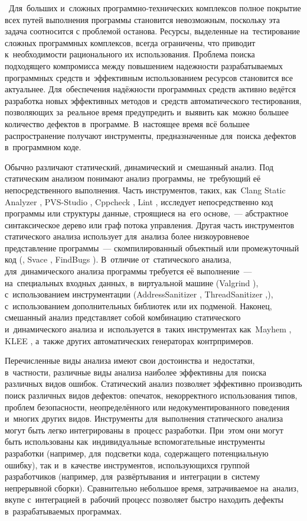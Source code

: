 \actuality\
Для~больших и~сложных программно-технических комплексов полное покрытие всех путей выполнения программы становится невозможным, поскольку эта задача соотносится с проблемой останова. Ресурсы, выделенные на~тестирование сложных программных комплексов, всегда ограничены, что приводит к~необходимости рационального  их использования. Проблема поиска подходящего компромисса  между повышением надежности разрабатываемых программных средств и~эффективным использованием ресурсов становится все актуальнее. Для~обеспечения надёжности программных средств  активно ведётся разработка новых эффективных методов и~средств автоматического тестирования, позволяющих за~реальное время предупредить и~выявить как~можно большее количество дефектов в~программе. В~настоящее время всё большее распространение получают инструменты, предназначенные для~поиска дефектов в~программном коде.

Обычно различают статический, динамический и~смешанный анализ. Под статическим анализом понимают анализ программы, не~требующий её непосредственного выполнения. Часть инструментов, таких, как~Clang Static Analyzer \cite{csa}, PVS-Studio \cite{pvs}, Cppcheck \cite{cppcheck}, Lint \cite{lint}, исследует непосредственно код программы или структуры данные, строящиеся на~его основе,~--- абстрактное синтаксическое дерево или граф потока управления. Другая часть инструментов статического анализа использует для~анализа более низкоуровневое представление программы~--- скомпилированный объектный или промежуточный код (, Svace \cite{svace}, FindBugs \cite{findbugs}). В~отличие от~статического анализа, для~динамического анализа программы требуется её выполнение~--- на~специальных входных данных, в~виртуальной машине (Valgrind \cite{valgrind}), с~использованием инструментации (AddressSanitizer \cite{asan}, ThreadSanitizer \cite{tsan},), с~использованием дополнительных библиотек или их подменой. Наконец, смешанный анализ представляет собой комбинацию статического и~динамического анализа и~используется в~таких инструментах как~Mayhem \cite{mayhem}, KLEE \cite{klee}, а~также других автоматических генераторах контрпримеров.

Перечисленные виды анализа имеют свои достоинства и~недостатки, в~частности, различные виды анализа наиболее эффективны для~поиска различных видов ошибок. Статический анализ позволяет эффективно производить поиск различных видов дефектов: опечаток, некорректного использования типов, проблем безопасности, неопределённого или недокументированного поведения и~многих других видов. Инструменты для~выполнения статического анализа могут быть легко интегрированы в~процесс разработки. При~этом они могут быть использованы как~индивидуальные вспомогательные инструменты разработки (например, для~подсветки кода, содержащего потенциальную ошибку), так и~в~качестве инструментов, использующихся группой разработчиков (например, для~развёртывания и~интеграции в~систему непрерывной сборки). Сравнительно небольшое время, затрачиваемое на~анализ, вкупе с~интеграцией в~рабочий процесс позволяет быстро находить дефекты в~разрабатываемых программах.

